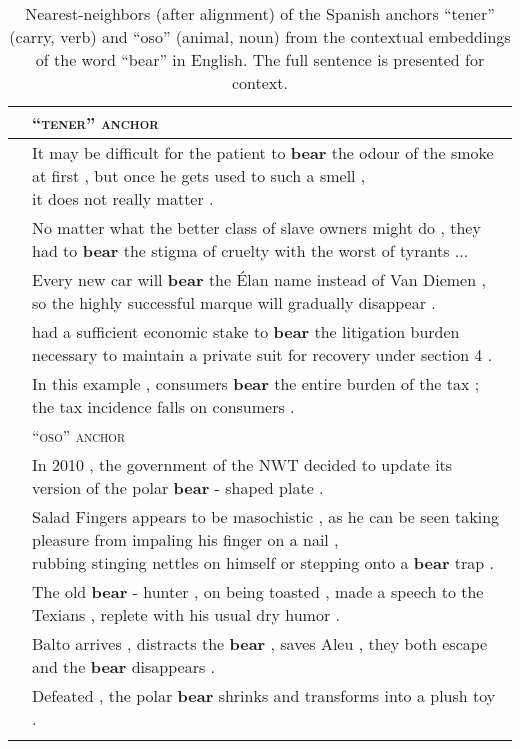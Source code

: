 \documentclass[11pt,a4paper]{article}
\begin{document}
\begin{table*}[t]
\small
\begin{center}
    \small
    \begin{tabular}{ll}
    \toprule
     & \textsc{``tener'' anchor}        \\
    \hline \addlinespace[0.5ex]
    1 & \specialcell{It may be difficult for the patient to \textbf{bear} the odour of the smoke at first , but once he gets used to such a smell , \\it does not really matter .}                  \\ \addlinespace[0.5ex]
    2 & No matter what the better class of slave owners might do , they had to \textbf{bear} the stigma of cruelty with the worst of tyrants ...               \\ \addlinespace[0.5ex]
    3 & Every new car will \textbf{bear} the Élan name instead of Van Diemen , so the highly successful marque will gradually disappear .            \\ \addlinespace[0.5ex]
    4 & had a sufficient economic stake to \textbf{bear} the litigation burden necessary to maintain a private suit for  recovery under section 4 .                \\ \addlinespace[0.5ex]
    5 & In this example , consumers \textbf{bear} the entire burden of the tax ; the tax incidence falls on consumers . \\ \addlinespace[0.5ex]
    
        \midrule
        
     & \textsc{``oso'' anchor}        \\
    \hline \addlinespace[0.5ex]
    1 & In 2010 , the government of the NWT decided to update its version of the polar \textbf{bear} - shaped plate .                  \\ \addlinespace[0.5ex]
    2 & \specialcell{Salad Fingers appears to be masochistic , as he can be seen taking pleasure from impaling his finger on a nail , \\ rubbing stinging nettles on himself or stepping onto a \textbf{bear} trap .}               \\ \addlinespace[0.5ex]
    3 & The old \textbf{bear} - hunter , on being toasted , made a speech to the Texians , replete with his usual dry humor .            \\ \addlinespace[0.5ex]
    4 & Balto arrives , distracts the \textbf{bear} , saves Aleu , they both escape and the \textbf{bear} disappears .                \\ \addlinespace[0.5ex]
    5 & Defeated , the polar \textbf{bear} shrinks and transforms into a plush toy .               \\ \addlinespace[0.5ex]


    \bottomrule
    \end{tabular}
    \smallskip
    \caption{Nearest-neighbors (after alignment) of the Spanish anchors ``tener'' (carry, verb) and ``oso'' (animal, noun) from the contextual embeddings of the word ``bear'' in English.  The full sentence is presented for context.}
    \label{tab:examples_bear}
    \end{center}
\end{table*} 
\end{document}
